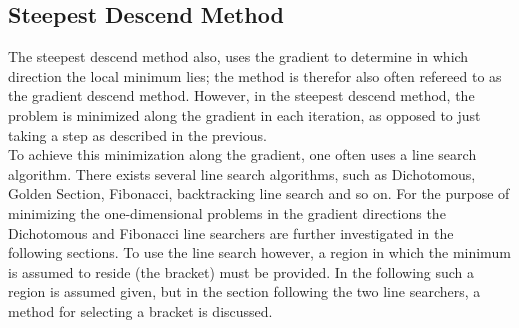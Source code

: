 \subsection{Steepest Descend Method}
The steepest descend method also, uses the gradient to determine in which direction the local minimum lies; the method is therefor also often refereed to as the gradient descend method. However, in the steepest descend method, the problem is minimized along the gradient in each iteration, as opposed to just taking a step as described in the previous.\\
To achieve this minimization along the gradient, one often uses a line search algorithm. There exists several line search algorithms, such as Dichotomous, Golden Section, Fibonacci, backtracking line search and so on. For the purpose of minimizing the one-dimensional problems in the gradient directions the Dichotomous and Fibonacci line searchers are further investigated in the following sections. To use the line search however, a region in which the minimum is assumed to reside (the bracket) must be provided. In the following such a region is assumed given, but in the section following the two line searchers, a method for selecting a bracket is discussed.